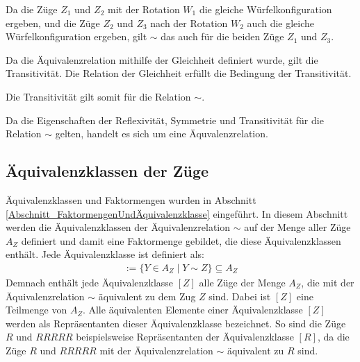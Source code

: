 \documentclass[12pt,a4paper, usenames, dvipsnames]{article}
\theoremstyle{mystyle}
\theoremstyle{definition}
\begin{document}
\begin{description}
Da die Züge $Z_1$ und $Z_2$ mit der Rotation $W_1$ die gleiche Würfelkonfiguration ergeben, und die Züge $Z_2$ und $Z_3$ nach der Rotation $W_2$ auch die gleiche Würfelkonfiguration ergeben, gilt $\sim$ das auch für die beiden Züge $Z_1$ und $Z_3$.

Da die Äquivalenzrelation mithilfe der Gleichheit definiert wurde, gilt die Transitivität. Die Relation der Gleichheit erfüllt die Bedingung der Transitivität.


Die Transitivität gilt somit für die Relation $\sim$.

\end{description}

Da die Eigenschaften der Reflexivität, Symmetrie und Transitivität für die Relation $\sim$ gelten, handelt es sich um eine Äquvalenzrelation.




%
%
%
%
%
%
%
%
%
%
%
%
%
%
%
%
%
%
%
%


\subsection{Äquivalenzklassen der Züge} 

\label{Abschnitt_ÄquivalenzklassenDerZüge}

Äquivalenzklassen und Faktormengen wurden in Abschnitt \ref{Abschnitt_FaktormengenUndÄquivalenzklasse} eingeführt. In diesem Abschnitt werden die Äquivalenzklassen der Äquivalenzrelation $\sim$ auf der Menge aller Züge $A_Z$ definiert und damit eine Faktormenge gebildet, die diese Äquivalenzklassen enthält. Jede Äquivalenzklasse ist definiert als:
\begin{align*}
[Z] := \{ Y \in A_Z \mid Y \sim Z \} \subseteq A_Z
\end{align*}
Demnach enthält jede Äquivalenzklasse $[Z]$ alle Züge der Menge $A_Z$, die mit der Äquivalenzrelation $\sim$ äquivalent zu dem Zug $Z$ sind. Dabei ist $[Z]$ eine Teilmenge von $A_Z$.  Alle äquivalenten Elemente einer Äquivalenzklasse $[Z]$ werden als Repräsentanten dieser Äquivalenzklasse bezeichnet. So sind die Züge $R$ und $RRRRR$ beispielsweise Repräsentanten der Äquivalenzklasse $[R]$, da die Züge $R$ und $RRRRR$ mit der Äquivalenzrelation $\sim$ äquivalent zu $R$ sind.
\end{document}
